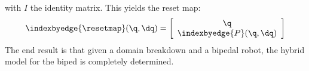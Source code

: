 with $I$ the identity matrix. This yields the reset map:
\begin{align}
 \indexbyedge{\resetmap}(\q,\dq) = \left[
    \begin{array}{c}
      \q \\
      \indexbyedge{P}(\q,\dq)
    \end{array}
    \right]
\end{align}
The end result is that given a domain breakdown and a bipedal robot, the hybrid model for the biped is completely determined.









